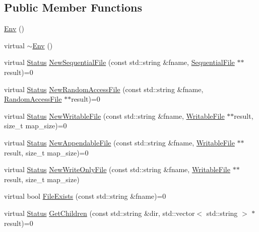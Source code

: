 \subsection*{Public Member Functions}
\begin{DoxyCompactItemize}
\item 
\hyperlink{classleveldb_1_1_env_a90f3648c740e3f5901f5843cd0dd07c4}{Env} ()
\item 
virtual \hyperlink{classleveldb_1_1_env_a2b9321c6176f8824b3ba65f0a36453fe}{$\sim$\+Env} ()
\item 
virtual \hyperlink{classleveldb_1_1_status}{Status} \hyperlink{classleveldb_1_1_env_ad73810059f48c1d7b91125d357e7d351}{New\+Sequential\+File} (const std\+::string \&fname, \hyperlink{classleveldb_1_1_sequential_file}{Sequential\+File} $\ast$$\ast$result)=0
\item 
virtual \hyperlink{classleveldb_1_1_status}{Status} \hyperlink{classleveldb_1_1_env_a1df3e0bb2d47ee914448df9bb9ca0734}{New\+Random\+Access\+File} (const std\+::string \&fname, \hyperlink{classleveldb_1_1_random_access_file}{Random\+Access\+File} $\ast$$\ast$result)=0
\item 
virtual \hyperlink{classleveldb_1_1_status}{Status} \hyperlink{classleveldb_1_1_env_aa5448f7abbefdf49f429ca36efbbe450}{New\+Writable\+File} (const std\+::string \&fname, \hyperlink{classleveldb_1_1_writable_file}{Writable\+File} $\ast$$\ast$result, size\+\_\+t map\+\_\+size)=0
\item 
virtual \hyperlink{classleveldb_1_1_status}{Status} \hyperlink{classleveldb_1_1_env_a7eb05528f915257ced149a8ddf7d249b}{New\+Appendable\+File} (const std\+::string \&fname, \hyperlink{classleveldb_1_1_writable_file}{Writable\+File} $\ast$$\ast$result, size\+\_\+t map\+\_\+size)=0
\item 
virtual \hyperlink{classleveldb_1_1_status}{Status} \hyperlink{classleveldb_1_1_env_ae50ecac51fb2b2a77bc8c18478a49096}{New\+Write\+Only\+File} (const std\+::string \&fname, \hyperlink{classleveldb_1_1_writable_file}{Writable\+File} $\ast$$\ast$result, size\+\_\+t map\+\_\+size)
\item 
virtual bool \hyperlink{classleveldb_1_1_env_acbb85047fdf7bf441bd365cfb09f9ecb}{File\+Exists} (const std\+::string \&fname)=0
\item 
virtual \hyperlink{classleveldb_1_1_status}{Status} \hyperlink{classleveldb_1_1_env_a53028e3112d7bb3bf6574ddaab18d6f6}{Get\+Children} (const std\+::string \&dir, std\+::vector$<$ std\+::string $>$ $\ast$result)=0
\item 
$$
\end{DoxyCompactItemize}
